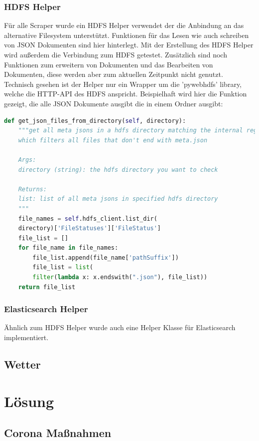 \documentclass[12pt,oneside,a4paper,parskip]{scrbook}
\begin{document}
\subsection{HDFS Helper}
F\"ur alle Scraper wurde ein HDFS Helper verwendet der die Anbindung an das alternative Filesystem unterst\"utzt. Funktionen f\"ur das Lesen wie auch schreiben von JSON Dokumenten sind hier hinterlegt.
Mit der Erstellung des HDFS Helper wird außerdem die Verbindung zum HDFS getestet. Zus\"atzlich sind noch Funktionen zum erweitern von Dokumenten und das Bearbeiten von Dokumenten, diese werden aber zum aktuellen Zeitpunkt nicht genutzt. \newline
Technisch gesehen ist der Helper nur ein Wrapper um die 'pywebhdfs' library, welche die HTTP-API des HDFS anspricht.
Beispielhaft wird hier die Funktion gezeigt, die alle JSON Dokumente ausgibt die in einem Ordner ausgibt:
\begin{lstlisting}[caption=HDFS Helper Beispiel ,label=hdfsHelperJsonInDoc,language=python]
def get_json_files_from_directory(self, directory):
	"""get all meta jsons in a hdfs directory matching the internal regex pattern
	which filters all files that don't end with meta.json

	Args:
	directory (string): the hdfs directory you want to check

	Returns:
	list: list of all meta jsons in specified hdfs directory
	"""
	file_names = self.hdfs_client.list_dir(
	directory)['FileStatuses']['FileStatus']
	file_list = []
	for file_name in file_names:
		file_list.append(file_name['pathSuffix'])
		file_list = list(
		filter(lambda x: x.endswith(".json"), file_list))
	return file_list

\end{lstlisting}
\subsection{Elasticsearch Helper}
\"Ahnlich zum HDFS Helper wurde auch eine Helper Klasse f\"ur Elasticsearch implementiert.
\section{Wetter}

\chapter{Lösung}
\section{Corona Maßnahmen}
\end{document}
